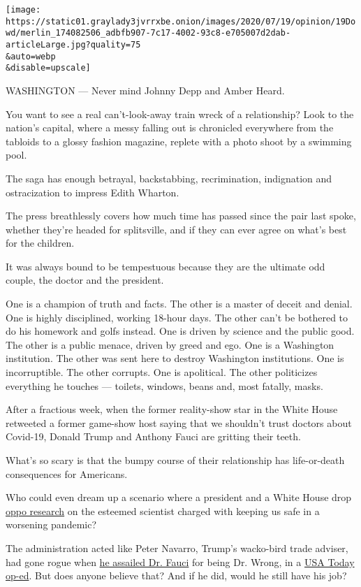 \texttt{[image: https://static01.graylady3jvrrxbe.onion/images/2020/07/19/opinion/19Dowd/merlin\_174082506\_adbfb907-7c17-4002-93c8-e705007d2dab-articleLarge.jpg?quality=75\\\&auto=webp\\\&disable=upscale]}

WASHINGTON --- Never mind Johnny Depp and Amber Heard.

You want to see a real can't-look-away train wreck of a relationship?
Look to the nation's capital, where a messy falling out is chronicled
everywhere from the tabloids to a glossy fashion magazine, replete with
a photo shoot by a swimming pool.

The saga has enough betrayal, backstabbing, recrimination, indignation
and ostracization to impress Edith Wharton.

The press breathlessly covers how much time has passed since the pair
last spoke, whether they're headed for splitsville, and if they can ever
agree on what's best for the children.

It was always bound to be tempestuous because they are the ultimate odd
couple, the doctor and the president.

One is a champion of truth and facts. The other is a master of deceit
and denial. One is highly disciplined, working 18-hour days. The other
can't be bothered to do his homework and golfs instead. One is driven by
science and the public good. The other is a public menace, driven by
greed and ego. One is a Washington institution. The other was sent here
to destroy Washington institutions. One is incorruptible. The other
corrupts. One is apolitical. The other politicizes everything he touches
--- toilets, windows, beans and, most fatally, masks.

After a fractious week, when the former reality-show star in the White
House retweeted a former game-show host saying that we shouldn't trust
doctors about Covid-19, Donald Trump and Anthony Fauci are gritting
their teeth.

What's so scary is that the bumpy course of their relationship has
life-or-death consequences for Americans.

Who could even dream up a scenario where a president and a White House
drop
\href{https://www.axios.com/mcenany-white-house-opposition-research-fauci-3e84b7ea-a368-48a2-9061-216a14a38612.html}{oppo
research} on the esteemed scientist charged with keeping us safe in a
worsening pandemic?

The administration acted like Peter Navarro, Trump's wacko-bird trade
adviser, had gone rogue when
\href{https://www.nytimes3xbfgragh.onion/2020/07/16/business/media/usa-today-peter-navarro-fauci.html}{he
assailed Dr. Fauci} for being Dr. Wrong, in a
\href{https://www.usatoday.com/story/opinion/todaysdebate/2020/07/14/anthony-fauci-wrong-with-me-peter-navarro-editorials-debates/5439374002/}{USA
Today op-ed}. But does anyone believe that? And if he did, would he
still have his job?


